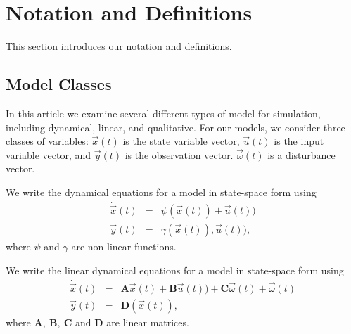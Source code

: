 \section{Notation and Definitions}
\label{sec-Notation-Defs}

This section introduces our notation and definitions.

\subsection{Model Classes}

In this article we examine several different  types of model for simulation, including dynamical, linear, and qualitative.
For our models, we consider three classes of variables:
$\vec{x}(t)$ is the state variable vector, $\vec{u}(t)$ is the input variable vector, and $\vec{y}(t)$ is the observation vector.
$\vec{\omega}(t)$ is a disturbance vector.

\begin{definition}
We write the dynamical equations for a model in state-space form using
\begin{eqnarray}\label{dyn-model}
\dot{\vec{x}}(t) & = & \psi (\vec{x}(t)) + \vec{u}(t))\\
\vec{y}(t) & = & \gamma (\vec{x}(t)), \vec{u}(t)),
\end{eqnarray}
where $\psi$ and $\gamma$ are non-linear functions.
\end{definition}

\begin{definition}
We write the linear dynamical equations for a model in state-space form using
\begin{eqnarray}\label{linear-model}
\dot{\vec{x}}(t) & = & \mathbf{A} \vec{x}(t) + \mathbf{B} \vec{u}(t)) + \mathbf{C} \vec{\omega}(t) +  \vec{\omega}(t)\\
\vec{y}(t) & = & \mathbf{D} (\vec{x}(t)),
\end{eqnarray}
where $\mathbf{A}, ~ \mathbf{B},~\mathbf{C}$ and $\mathbf{D}$ are linear matrices.
\end{definition}


